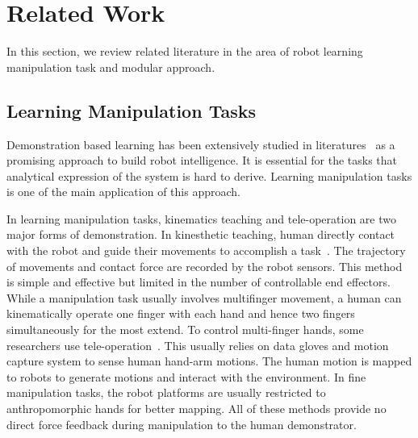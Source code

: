\section{Related Work}
\label{sec:related}
In this section, we review related literature in the area of robot learning manipulation task and modular approach.



\subsection{Learning Manipulation Tasks}
Demonstration based learning has been extensively studied in literatures~\cite{calinon2007learning,dillmann2004teaching,kulic2012incremental} as a promising approach to build robot intelligence. It is essential for the tasks that analytical expression of the system is hard to derive.
Learning manipulation tasks is one of the main application of this approach.

In learning manipulation tasks, kinematics teaching and tele-operation are two major forms of demonstration. In kinesthetic teaching, human directly contact with the robot and guide their movements to accomplish a task~\cite{korkinof2013online,pais2014encoding,pastor2011skill,Miao2014}. The trajectory of movements and contact force are recorded by the robot sensors.
This method is simple and effective but limited in the number of controllable end effectors. While a manipulation task usually involves multifinger movement, a human can kinematically operate one finger with each hand and hence two fingers simultaneously for the most extend. To control multi-finger hands, some researchers use tele-operation~\cite{bernardino2013precision,kondo2008recognition,Fischer98}. This usually relies on data gloves and motion capture system to sense human hand-arm motions. The human motion is mapped to robots to generate motions and interact with the environment. In fine manipulation tasks, the robot platforms are usually restricted to anthropomorphic hands for better mapping. All of these methods provide no direct force feedback during manipulation to the human demonstrator.

